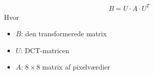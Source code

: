 \begin{align}
B=U \cdot A \cdot U^T
\label{eq:DCTtrans}
\end{align}
Hvor
\begin{itemize}
	\item $B$: den transformerede matrix
	\item $U$: DCT-matricen
	\item $A$: $8\times8$ matrix af pixelværdier
\end{itemize}
